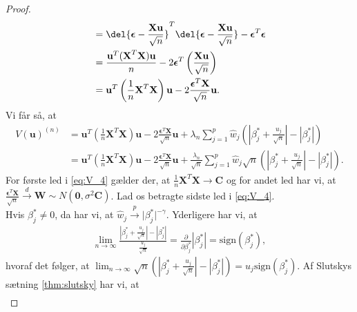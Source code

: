 \begin{proof}
\begin{align*}
&= \del{\boldsymbol{\epsilon} - \frac{\textbf{X}\textbf{u}}{\sqrt{n}}}^T \del{\boldsymbol{\epsilon} - \frac{\textbf{X}\textbf{u}}{\sqrt{n}}} - \boldsymbol{\epsilon}^T \boldsymbol{\epsilon} \\
& = \frac{\textbf{u}^T (\textbf{X}^T\textbf{X})  \textbf{u}}{n} - 2 \boldsymbol{\epsilon}^T \left( \frac{\mathbf{X}\mathbf{u}}{\sqrt{n}} \right) \\ 
&= \textbf{u}^T \left(\frac{1}{n}\textbf{X}^T\textbf{X}\right)  \textbf{u}- 2 \frac{\boldsymbol{\epsilon}^T \textbf{X}}{\sqrt{n}}\textbf{u}.
\end{align*}
Vi får så, at 
\begin{align}
V(\mathbf{u})^{(n)} & = \textbf{u}^T \left(\frac{1}{n}\textbf{X}^T\textbf{X}\right)  \textbf{u} - 2 \frac{\boldsymbol{\epsilon}^T \textbf{X}}{\sqrt{n}}\textbf{u} + \lambda_n \sum_{j=1}^p \widehat{w}_j \left( \left\vert \beta_j^{*} + \frac{u_j}{\sqrt{n}} \right\vert - \left\vert \beta_j^{*}\right\vert
\right) \nonumber \\
 & = \textbf{u}^T \left(\frac{1}{n}\textbf{X}^T\textbf{X}\right)  \textbf{u} - 2 \frac{\boldsymbol{\epsilon}^T \textbf{X}}{\sqrt{n}}\textbf{u} +\frac{\lambda_n}{\sqrt{n}} \sum_{j=1}^p \widehat{w}_j \sqrt{n} \left( \left\vert \beta_j^{*} + \frac{u_j}{\sqrt{n}} \right\vert - \left\vert \beta_j^{*} \right\vert
\right). \label{eq:V_4}
\end{align}
%
For første led i \eqref{eq:V_4} gælder der, at $\frac{1}{n} \mathbf{X}^T \mathbf{X} \rightarrow \mathbf{C}$ og for andet led har vi, at $\frac{\boldsymbol{\epsilon}^T \mathbf{X}}{\sqrt{n}} \overset{d}{\rightarrow} \textbf{W}\sim N(\textbf{0},\sigma^2 \boldsymbol{C})$. 
Lad os betragte sidste led i \eqref{eq:V_4}. \\
Hvis $\beta_j^{*} \neq 0$, da har vi, at $\widehat{w}_j \overset{p}{\rightarrow} \vert \beta_j^{*} \vert^{-\gamma}$. Yderligere har vi, at 
\begin{align*}
\lim_{n\rightarrow \infty}
\frac{\left\vert \beta_j^{*} +\frac{u_j}{\sqrt{n}} \right\vert - \left\vert \beta_j^{*} \right\vert}{\frac{u_j}{\sqrt{n}}} =\frac{\partial}{\partial \beta_j^{*}} \left\vert \beta_j^{*} \right\vert =\text{sign}\left(\beta_j^{*} \right),
\end{align*} 
hvoraf det følger, at $\lim_{n\rightarrow \infty} \sqrt{n} \left( \left\vert \beta_j^{*} +\frac{u_j}{\sqrt{n}} \right\vert - \left\vert \beta_j^{*} \right\vert \right) = u_j \text{sign}\left(\beta_j^{*} \right)$.
Af Slutskys sætning \ref{thm:slutsky} har vi, at 
\begin{align*}

\end{align*}
\end{proof}
